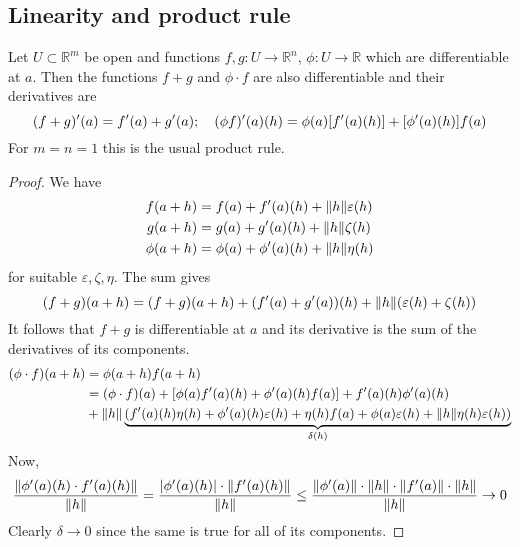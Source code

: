 \subsection{Linearity and product rule}
\begin{proposition}
	Let \( U \subset \mathbb R^m \) be open and functions \( f,g \colon U \to \mathbb R^n \), \( \phi \colon U \to \mathbb R \) which are differentiable at \( a \).
	Then the functions \( f + g \) and \( \phi \cdot f \) are also differentiable and their derivatives are
	\[
		(f+g)'(a) = f'(a) + g'(a);\quad (\phi f)'(a)(h) = \phi(a)\qty[f'(a)(h)] + \qty[\phi'(a)(h)] f(a)
	\]
	For \( m = n = 1 \) this is the usual product rule.
\end{proposition}
\begin{proof}
	We have
	\begin{align*}
		f(a+h)    & = f(a) + f'(a)(h) + \norm{h}\varepsilon(h) \\
		g(a+h)    & = g(a) + g'(a)(h) + \norm{h} \zeta(h)      \\
		\phi(a+h) & = \phi(a) + \phi'(a)(h) + \norm{h}\eta(h)
	\end{align*}
	for suitable \( \varepsilon, \zeta, \eta \).
	The sum gives
	\[
		(f+g)(a+h) = (f+g)(a+h) + (f'(a) + g'(a))(h) + \norm{h}(\varepsilon(h) + \zeta(h))
	\]
	It follows that \( f+g \) is differentiable at \( a \) and its derivative is the sum of the derivatives of its components.
	\begin{align*}
		(\phi \cdot f)(a+h) & = \phi(a+h) f(a+h)                                                                                                                                                \\
		                    & = (\phi \cdot f)(a) + \qty[\phi(a) f'(a)(h) + \phi'(a)(h) f(a)] + f'(a)(h) \phi'(a)(h)                                                                            \\
		                    & + \norm{h} \underbrace{\qty(f'(a)(h) \eta(h) + \phi'(a)(h) \varepsilon(h) + \eta(h) f(a) + \phi(a) \varepsilon(h) + \norm{h} \eta(h) \varepsilon(h))}_{\delta(h)}
	\end{align*}
	Now,
	\[
		\frac{\norm{\phi'(a)(h) \cdot f'(a)(h)}}{\norm{h}} = \frac{\abs{\phi'(a)(h)} \cdot \norm{f'(a)(h)}}{\norm{h}} \leq \frac{\norm{\phi'(a)} \cdot \norm{h} \cdot \norm{f'(a)} \cdot \norm{h}}{\norm{h}} \to 0
	\]
	Clearly \( \delta \to 0 \) since the same is true for all of its components.
\end{proof}

